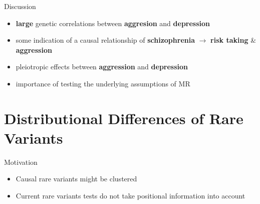 \documentclass{beamer}
\begin{document}
  \begin{frame}[t]{Discussion}
    \begin{itemize}
      \item \textbf{large} genetic correlations between \textbf{aggresion} and \textbf{depression}
      \item some indication of a causal relationship of \textbf{schizophrenia} $\rightarrow$ \textbf{risk taking} \& \textbf{aggression}
      \item pleiotropic effects between \textbf{aggression} and \textbf{depression} 
      \item importance of testing the underlying assumptions of MR
    \end{itemize} 
  \end{frame}

  \section{Distributional Differences of Rare Variants}

  \begin{frame}[t]{Motivation}
    \begin{itemize}
      \item Causal rare variants might be clustered
      \item Current rare variants tests do not take positional information into account
    \end{itemize} 
  \end{frame}
\end{document}
